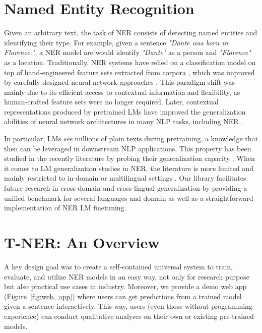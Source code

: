 \documentclass[11pt,a4paper]{article}
\begin{document}
\section{Named Entity Recognition}
\label{sec:ner}

Given an arbitrary text, the task of NER consists of detecting named entities and identifying their type.
For example, given a sentence {\it "Dante was born in Florence."}, a NER model are would identify {\it "Dante"} as a person and {\it "Florence"} as a location. 
Traditionally, NER systems have relied on a classification model on top of hand-engineered feature sets extracted from corpora \citep{ratinov-roth-2009-design, collobert2011natural}, which was improved by carefully designed neural network approaches \citep{lample-etal-2016-neural, chiu-nichols-2016-named, ma-hovy-2016-end}. This paradigm shift was mainly due to its efficient access to contextual information and flexibility, as human-crafted feature sets were no longer required.
Later, contextual representations produced by pretrained LMs have improved the generalization abilities of neural network architectures in many NLP tasks, including NER \citep{peters-etal-2018-deep, devlin2018bert}. 



In particular, LMs \textit{see} millions of plain texts during pretraining, a knowledge that then can be leveraged in downstream NLP applications. This property has been studied in the recently literature by probing their generalization capacity \citep{hendrycks2020pretrained,aharoni-goldberg-2020-unsupervised, desai2020calibration, gururangan2020don}. When it comes to LM generalization studies in NER, the literature is more limited and mainly restricted to in-domain \cite{agarwal2021entity} or multilingual settings \citep{pfeiffer2020mad, hu2020xtreme}. Our library facilitates future research in cross-domain and cross-lingual generalization by providing a unified benchmark for several languages and domain as well as a straightforward implementation of NER LM finetuning.



\section{T-NER: An Overview}
\label{sec:system-overview}


A key design goal was to create a self-contained universal system to train, evaluate, and utilize NER models in an easy way, not only for research purpose but also practical use cases in industry. Moreover, we provide a demo web app (Figure~\ref{fig:web_app}) where users can get predictions from a trained model given a sentence interactively. This way, users (even those without programming experience) can conduct qualitative analyses on their own or existing pre-trained models. 
\end{document}
